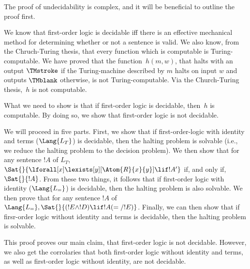 \documentclass[../../include/open-logic-section]{subfiles}
\begin{document}

\begin{explain}
The proof of undecidability is complex, and it will be beneficial to
outline the proof first. 

We know that first-order logic is decidable iff there is an effective mechanical
method for determining whether or not a sentence is valid. We also know, from
the Chruch-Turing thesis, that every function which is computable is 
Turing-computable. We have proved that the function~$h(m,w)$, that halts with
an output $\TMstroke$ if the Turing-machine described by $m$ halts on input $w$ 
and outputs $\TMblank$ otherwise, is not Turing-computable. Via the Church-Turing
thesis,~$h$ is not computable. 

What we need to show is that if first-order logic is decidable, then~$h$
is computable. By doing so, we show that first-order logic is not decidable.

We will proceed in five parts. First, we show that
if first-order-logic with identity and terms ($\Lang{L_T}$) is decidable,
then the halting problem is solvable (i.e., we reduce the halting problem to the
decision problem). We then show that for any sentence $!A$ of $L_T$,
$\Sat{}{\lforall[x]\lexists[y][\Atom{R}{x}{y}]\lif !A'}$ if, and only if,
$\Sat{}{!A}$. From these two things, it follows that if first-order
logic with identity ($\Lang{L_=}$) is decidable, then the halting problem
 is also solvable. We then prove that for any sentence $!A$ of $\Lang{L_=} , 
\Sat{}{(!E \land !D) \lif !A(=/!E)}$. Finally, we can then show that if firsr-order
logic without identity and terms is decidable, then the halting problem is 
solvable.

This proof proves our main claim, that first-order logic is not decidable. However,
we also get the corrolaries that both first-order logic without identity and terms,
as well as first-order logic without identity, are not decidable.


\end{explain}
\end{document}
